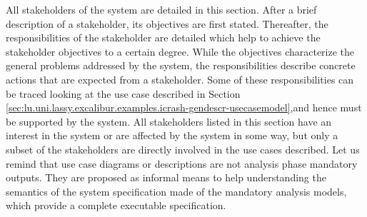All stakeholders of the system are detailed in this section. After a brief description of a
stakeholder, its objectives are first stated. Thereafter, the responsibilities of
the stakeholder are detailed which help to achieve the stakeholder objectives to a certain
degree. While the objectives characterize the general problems addressed by the \msricrash system,
the responsibilities describe concrete actions that are expected from a stakeholder. Some of
these responsibilities can be traced looking at the use case described in Section \ref{sec:lu.uni.lassy.excalibur.examples.icrash-gendescr-usecasemodel},and hence must be supported by the \msricrash  system. 
All stakeholders listed in this section have an interest in the system or are affected
by the system in some way, but only a subset of the stakeholders are directly involved in the use
cases described.
Let us remind that use case diagrams or descriptions are not \msrmessir analysis phase mandatory outputs. They are proposed as informal means to help understanding the semantics of the system specification made of the mandatory analysis models, which provide a complete executable specification.
